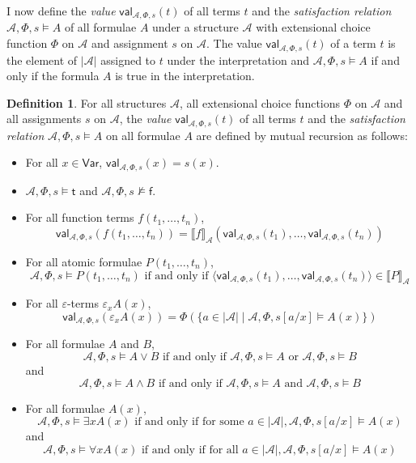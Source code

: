 \documentclass[10pt]{article}
\theoremstyle{definition}\newtheorem{remark}[theorem]{Remark}
\theoremstyle{definition}\newtheorem{example}[theorem]{Example}
\theoremstyle{definition}\newtheorem{definition}[theorem]{Definition}
\newcommand{\trueUnit}{\mathsf{t}}
\newcommand{\falseUnit}{\mathsf{f}}
\newcommand{\variablesSet}{\mathsf{Var}}
\begin{document}
	I now define the \textit{value} $\mathsf{val}_{\mathcal{A}, \Phi, s}(t)$ of all terms $t$ and the \textit{satisfaction relation} $\mathcal{A}, \Phi, s \models A$ of all formulae $A$ under a structure $\mathcal{A}$ with extensional choice function $\Phi$ on $\mathcal{A}$ and assignment $s$ on $\mathcal{A}$. The value $\mathsf{val}_{\mathcal{A}, \Phi, s}(t)$ of a term $t$ is the element of $| \mathcal{A} |$ assigned to $t$ under the interpretation and $\mathcal{A}, \Phi, s \models A$ if and only if the formula $A$ is true in the interpretation.

	\begin{definition}
		\newcommand{\val}{\mathsf{val}_{\mathcal{A}, \Phi, s}}
		For all structures $\mathcal{A}$, all extensional choice functions $\Phi$ on $\mathcal{A}$ and all assignments $s$ on $\mathcal{A}$, the \textit{value} $\val(t)$ of all terms $t$ and the \textit{satisfaction relation} $\mathcal{A}, \Phi, s \models A$ on all formulae $A$ are defined by mutual recursion as follows:
		\begin{itemize}
			\item For all $x \in \variablesSet$, $\val(x) = s(x)$.
			
			\item $\mathcal{A}, \Phi, s \models \trueUnit$ and $\mathcal{A}, \Phi, s \nvDash \falseUnit$.
			
			\item For all function terms $f(t_1, \dots, t_n)$,
			\[
				\val(f(t_1, \dots, t_n)) = \llbracket f \rrbracket_\mathcal{A}(\val(t_1), \dots, \val(t_n))
			\]
			
			\item For all atomic formulae $P(t_1, \dots, t_n)$,
			\[
				\mathcal{A}, \Phi, s \models P(t_1, \dots, t_n) \text{ if and only if } \langle \val(t_1), \dots, \val(t_n) \rangle \in \llbracket P \rrbracket_\mathcal{A}
			\]
			
			\item For all $\varepsilon$-terms $\varepsilon_x A(x)$,
			\[
				\val(\varepsilon_x A(x)) = \Phi(\{a \in | \mathcal{A} | \mid \mathcal{A}, \Phi, s [a / x] \models A(x)\})
			\]
			
			\item For all formulae $A$ and $B$,
			\[
				\mathcal{A}, \Phi, s \models A \lor B \text{ if and only if } \mathcal{A}, \Phi, s \models A \text{ or } \mathcal{A}, \Phi, s \models B
			\]
			and
			\[
				\mathcal{A}, \Phi, s \models A \land B \text{ if and only if } \mathcal{A}, \Phi, s \models A \text{ and } \mathcal{A}, \Phi, s \models B
			\]
			
			\item For all formulae $A(x)$,
			\[
				\mathcal{A}, \Phi, s \models \exists x A(x) \text{ if and only if for some } a \in | \mathcal{A} |, \mathcal{A}, \Phi, s [a / x] \models A(x)
			\]
			and
			\[
				\mathcal{A}, \Phi, s \models \forall x A(x) \text{ if and only if for all } a \in | \mathcal{A} |, \mathcal{A}, \Phi, s [a / x] \models A(x)
			\]
		\end{itemize}
	\end{definition}
\end{document}
